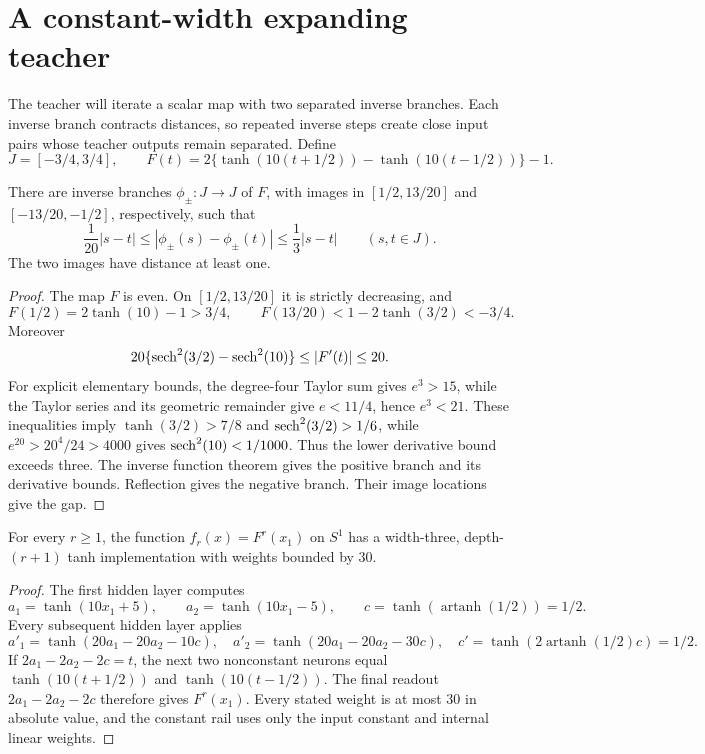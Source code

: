 \documentclass[11pt]{article}
\theoremstyle{remark}\newtheorem{remark}[theorem]{Remark}
\begin{document}
\section{A constant-width expanding teacher}\label{sec:map}
The teacher will iterate a scalar map with two separated inverse
branches. Each inverse branch contracts distances, so repeated inverse
steps create close input pairs whose teacher outputs remain separated.
Define
\begin{equation}\label{eq:map}
 J=[-3/4,3/4],\qquad
 F(t)=2\{\tanh(10(t+1/2))-\tanh(10(t-1/2))\}-1.
\end{equation}

\begin{lemma}\label{lem:branches}
There are inverse branches $\phi_\pm:J\to J$ of $F$, with images
in $[1/2,13/20]$ and $[-13/20,-1/2]$, respectively, such that
\begin{equation}\label{eq:branches}
 \frac1{20}|s-t|\le|\phi_\pm(s)-\phi_\pm(t)|
 \le\frac13|s-t|\qquad(s,t\in J).
\end{equation}
The two images have distance at least one.
\end{lemma}
\begin{proof}
The map $F$ is even. On $[1/2,13/20]$ it is strictly decreasing, and
\[
 F(1/2)=2\tanh(10)-1>3/4,
 \qquad F(13/20)<1-2\tanh(3/2)<-3/4.
\]
Moreover
\[
 20\{\mathrm{sech}^2(3/2)-\mathrm{sech}^2(10)\}
 \le |F'(t)|\le20.
\]
For explicit elementary bounds, the degree-four Taylor sum gives
$e^3>15$, while the Taylor series and its geometric remainder give
$e<11/4$, hence $e^3<21$. These inequalities imply
$\tanh(3/2)>7/8$ and $\mathrm{sech}^2(3/2)>1/6$, while
$e^{20}>20^4/24>4000$ gives $\mathrm{sech}^2(10)<1/1000$.
Thus the lower derivative bound exceeds three. The inverse function
theorem gives the positive branch and its derivative bounds. Reflection
gives the negative branch. Their image locations give the gap.
\end{proof}

\begin{lemma}\label{lem:teacher}
For every $r\ge1$, the function $f_r(x)=F^r(x_1)$ on $S^1$ has a
width-three, depth-$(r+1)$ tanh implementation with weights bounded by $30$.
\end{lemma}
\begin{proof}
The first hidden layer computes
\[
 a_1=\tanh(10x_1+5),\qquad
 a_2=\tanh(10x_1-5),\qquad c=\tanh(\operatorname{artanh}(1/2))=1/2.
\]
Every subsequent hidden layer applies
\[
 a'_1=\tanh(20a_1-20a_2-10c),\quad
 a'_2=\tanh(20a_1-20a_2-30c),\quad
 c'=\tanh(2\operatorname{artanh}(1/2)c)=1/2.
\]
If $2a_1-2a_2-2c=t$, the next two nonconstant neurons equal
$\tanh(10(t+1/2))$ and $\tanh(10(t-1/2))$.
The final readout $2a_1-2a_2-2c$ therefore gives $F^r(x_1)$.
Every stated weight is at most $30$ in absolute value, and the
constant rail uses only the input constant and internal linear weights.
\end{proof}
\end{document}
